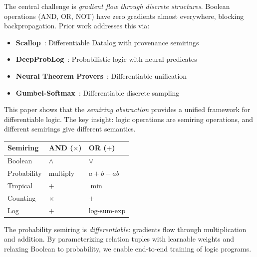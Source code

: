 \documentclass[11pt,a4paper]{article}
\begin{document}
The central challenge is \emph{gradient flow through discrete structures}.
Boolean operations (AND, OR, NOT) have zero gradients almost everywhere, blocking backpropagation.
Prior work addresses this via:
\begin{itemize}
  \item \textbf{Scallop}~\cite{scallop_chirho}: Differentiable Datalog with provenance semirings
  \item \textbf{DeepProbLog}~\cite{deepproblog_chirho}: Probabilistic logic with neural predicates
  \item \textbf{Neural Theorem Provers}~\cite{neural_theorem_provers_chirho}: Differentiable unification
  \item \textbf{Gumbel-Softmax}~\cite{gumbel_softmax_chirho}: Differentiable discrete sampling
\end{itemize}

This paper shows that the \emph{semiring abstraction} provides a unified framework for differentiable logic.
The key insight: logic operations are semiring operations, and different semirings give different semantics.

\begin{center}
\begin{tabular}{lll}
\toprule
\textbf{Semiring} & \textbf{AND ($\times$)} & \textbf{OR ($+$)} \\
\midrule
Boolean & $\land$ & $\lor$ \\
Probability & multiply & $a + b - ab$ \\
Tropical & $+$ & $\min$ \\
Counting & $\times$ & $+$ \\
Log & $+$ & $\text{log-sum-exp}$ \\
\bottomrule
\end{tabular}
\end{center}

The probability semiring is \emph{differentiable}: gradients flow through multiplication and addition.
By parameterizing relation tuples with learnable weights and relaxing Boolean to probability, we enable end-to-end training of logic programs.
\end{document}
